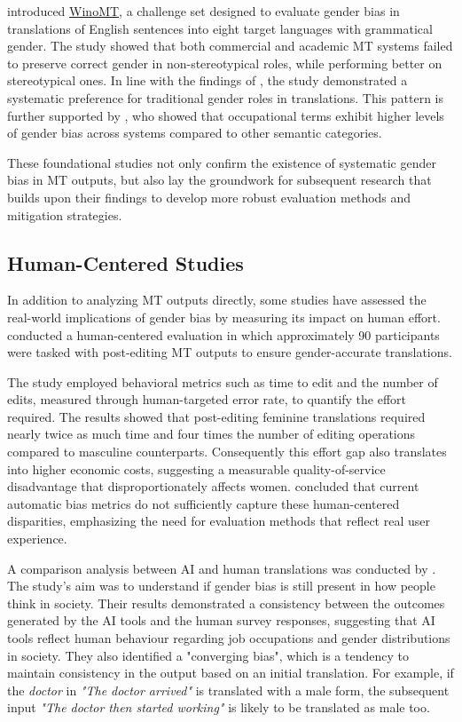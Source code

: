 \textbf{\citet{stanovskyEvaluatingGenderBias2019}} introduced \href{https://github.com/gabrielStanovsky/mt_gender}{WinoMT}, a challenge set designed to evaluate gender bias in translations of English sentences into eight target languages with grammatical gender. The study showed that both commercial and academic MT systems failed to preserve correct gender in non-stereotypical roles, while performing better on stereotypical ones. In line with the findings of \citeauthor{pratesAssessingGenderBias2019}, the study demonstrated a systematic preference for traditional gender roles in translations. This pattern is further supported by \textbf{\citet{choMeasuringGenderBias2019}}, who showed that occupational terms exhibit higher levels of gender bias across systems compared to other semantic categories. 

These foundational studies not only confirm the existence of systematic gender bias in MT outputs, but also lay the groundwork for subsequent research that builds upon their findings to develop more robust evaluation methods and mitigation strategies.

\subsection{Human-Centered Studies}
In addition to analyzing MT outputs directly, some studies have assessed the real-world implications of gender bias by measuring its impact on human effort. \citet{savoldiWhatHarmQuantifying2024} conducted a human-centered evaluation in which approximately 90 participants were tasked with post-editing MT outputs to ensure gender-accurate translations.

The study employed behavioral metrics such as time to edit and the number of edits, measured through human-targeted error rate, to quantify the effort required. The results showed that post-editing feminine translations required nearly twice as much time and four times the number of editing operations compared to masculine counterparts. Consequently this effort gap also translates into higher economic costs, suggesting a measurable quality-of-service disadvantage that disproportionately affects women. \citeauthor{savoldiWhatHarmQuantifying2024} concluded that current automatic bias metrics do not sufficiently capture these human-centered disparities, emphasizing the need for evaluation methods that reflect real user experience.

A comparison analysis between AI and human translations was conducted by \citet{smacchiaDoesAIReflect2024}. The study's aim was to understand if gender bias is still present in how people think in society. Their results demonstrated a consistency between the outcomes generated by the AI tools and the human survey responses, suggesting that AI tools reflect human behaviour regarding job occupations and gender distributions in society. They also identified a "converging bias", which is a tendency to maintain consistency in the output based on an initial translation. For example, if the \textit{doctor} in \textit{"The doctor arrived"} is translated with a male form, the subsequent input \textit{"The doctor then started working"} is likely to be translated as male too.

